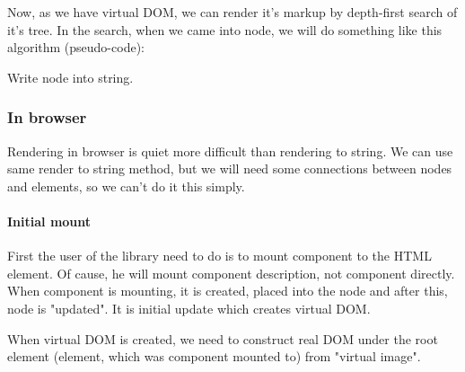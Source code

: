 \documentclass[oneside, 12pt]{book}
\begin{document}
      Now, as we have virtual DOM, we can render it's markup by depth-first search of it's tree. 
      In the search, when we came into node, we will do something like this algorithm (pseudo-code):
      \begin{algorithm}[H]
        \caption{Write node into string.}
      \end{algorithm}

    \subsubsection{In browser}\label{subsec:our-architecture-rendering-browser}
      Rendering in browser is quiet more difficult than rendering to string. 
      We can use same render to string method, but we will need some connections between nodes and elements, 
      so we can't do it this simply.

      \paragraph{Initial mount}\label{par:our-architecture-rendering-browser-init} 
        First the user of the library need to do is to mount component to the HTML element. 
        Of cause, he will mount component description, not component directly.
        When component is mounting, it is created, placed into the node and after this, node is "updated". 
        It is initial update which creates virtual DOM. 

        When virtual DOM is created, we need to construct real DOM under the root element 
        (element, which was component mounted to) from "virtual image".
\end{document}
